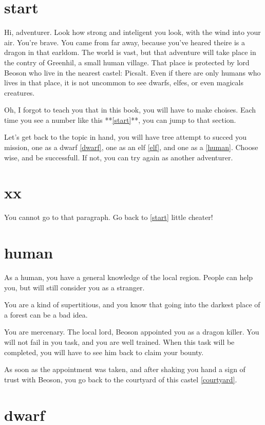 \section{start}

Hi, adventurer. Look how strong and inteligent you look, with the wind into your
air. You're brave. You came from far away, because you've heared theire is a
dragon in that earldom. The world is vast, but that adventure will take place in
the contry of Greenhil, a small human village. That place is protected by lord
Beoson who live in the nearest castel: Picsalt. Even if there are only humans who
lives in that place, it is not uncommon to see dwarfs, elfes, or even magicals
creatures.

Oh, I forgot to teach you that in this book, you will have to make choises. Each
time you see a number like this **\ref{start}**, you can jump to that section.

Let's get back to the topic in hand, you will have tree attempt to succed you
mission, one as a dwarf \ref{dwarf}, one as an elf \ref{elf}, and one as a
\ref{human}. Choose wise, and be successfull. If not, you can try again as
another adventurer.

\section{xx}

You cannot go to that paragraph. Go back to \ref{start} little cheater!

\section{human}

As a human, you have a general knowledge of the local region. People can help
you, but will still consider you as a stranger.

You are a kind of supertitious, and you know that going into the darkest place
of a forest can be a bad idea.

You are mercenary. The local lord, Beoson appointed you as a dragon killer. You
will not fail in you task, and you are well trained. When this task will be
completed, you will have to see him back to claim your bounty.

As soon as the appointment was taken, and after shaking you hand a sign of trust
with Beoson, you go back to the courtyard of this castel \ref{courtyard}.

\section{dwarf}

